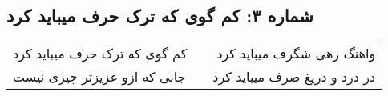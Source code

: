 \begin{center}
\section*{شماره ۳: کم گوی که ترک حرف میباید کرد}
\label{sec:003}
\begin{longtable}{l p{0.5cm} r}
کم گوی که ترک حرف میباید کرد
&&
واهنگ رهی شگرف میباید کرد
\\
جانی که ازو عزیزتر چیزی نیست
&&
در درد و دریغ صرف میباید کرد
\\
\end{longtable}
\end{center}
